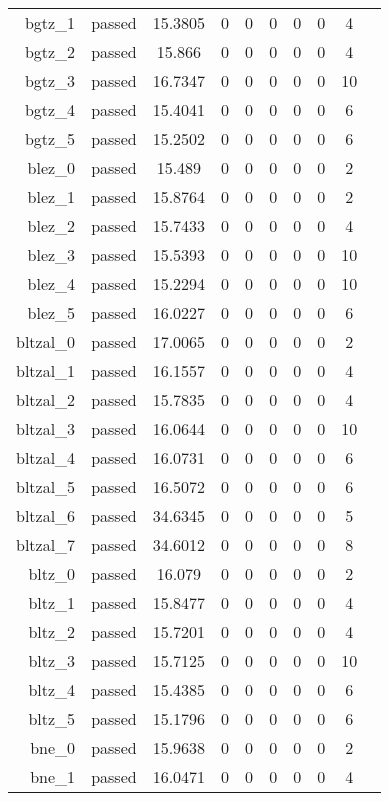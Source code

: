 \begin{longtable}{r|ccccccccc}
    bgtz\_1 & passed & 15.3805 & 0 & 0 & 0 & 0 & 0 & 4 \\
    bgtz\_2 & passed & 15.866 & 0 & 0 & 0 & 0 & 0 & 4 \\
    bgtz\_3 & passed & 16.7347 & 0 & 0 & 0 & 0 & 0 & 10 \\
    bgtz\_4 & passed & 15.4041 & 0 & 0 & 0 & 0 & 0 & 6 \\
    bgtz\_5 & passed & 15.2502 & 0 & 0 & 0 & 0 & 0 & 6 \\
    blez\_0 & passed & 15.489 & 0 & 0 & 0 & 0 & 0 & 2 \\
    blez\_1 & passed & 15.8764 & 0 & 0 & 0 & 0 & 0 & 2 \\
    blez\_2 & passed & 15.7433 & 0 & 0 & 0 & 0 & 0 & 4 \\
    blez\_3 & passed & 15.5393 & 0 & 0 & 0 & 0 & 0 & 10 \\
    blez\_4 & passed & 15.2294 & 0 & 0 & 0 & 0 & 0 & 10 \\
    blez\_5 & passed & 16.0227 & 0 & 0 & 0 & 0 & 0 & 6 \\
    bltzal\_0 & passed & 17.0065 & 0 & 0 & 0 & 0 & 0 & 2 \\
    bltzal\_1 & passed & 16.1557 & 0 & 0 & 0 & 0 & 0 & 4 \\
    bltzal\_2 & passed & 15.7835 & 0 & 0 & 0 & 0 & 0 & 4 \\
    bltzal\_3 & passed & 16.0644 & 0 & 0 & 0 & 0 & 0 & 10 \\
    bltzal\_4 & passed & 16.0731 & 0 & 0 & 0 & 0 & 0 & 6 \\
    bltzal\_5 & passed & 16.5072 & 0 & 0 & 0 & 0 & 0 & 6 \\
    bltzal\_6 & passed & 34.6345 & 0 & 0 & 0 & 0 & 0 & 5 \\
    bltzal\_7 & passed & 34.6012 & 0 & 0 & 0 & 0 & 0 & 8 \\
    bltz\_0 & passed & 16.079 & 0 & 0 & 0 & 0 & 0 & 2 \\
    bltz\_1 & passed & 15.8477 & 0 & 0 & 0 & 0 & 0 & 4 \\
    bltz\_2 & passed & 15.7201 & 0 & 0 & 0 & 0 & 0 & 4 \\
    bltz\_3 & passed & 15.7125 & 0 & 0 & 0 & 0 & 0 & 10 \\
    bltz\_4 & passed & 15.4385 & 0 & 0 & 0 & 0 & 0 & 6 \\
    bltz\_5 & passed & 15.1796 & 0 & 0 & 0 & 0 & 0 & 6 \\
    bne\_0 & passed & 15.9638 & 0 & 0 & 0 & 0 & 0 & 2 \\
    bne\_1 & passed & 16.0471 & 0 & 0 & 0 & 0 & 0 & 4 \\

\end{longtable}
